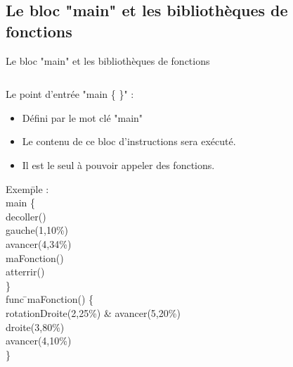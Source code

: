 \documentclass{bredelebeamer}
\begin{document}
\subsection{Le bloc "main" et les bibliothèques de fonctions} 
\begin{frame}{Le bloc "main" et les bibliothèques de fonctions} 

\begin{columns}

\begin{column}{0.5\textwidth}


Le point d'entrée "main \{ \}" :\\
\begin{itemize}
\item Défini par le mot clé "main"
\item Le contenu de ce bloc d'instructions sera exécuté.
\item Il est le seul à pouvoir appeler des fonctions.
\end{itemize}\pause

\begin{tabbing}
Exem\=ple :\\
	\>\color{Framarouge}main  \{\=\\ 
	\>\>\color{Framarouge}decoller()\\
	\>\>\color{Framarouge}gauche(\color{black}1\color{Framarouge},\color{Framagris}10\%\color{Framarouge})\\ 
	\>\>\color{Framarouge}avancer(\color{black}4\color{Framarouge},\color{Framagris}34\%\color{Framarouge})\\
	\>\>\color{Framarouge}maFonction()\\ 
	\>\>\color{Framarouge}atterrir()\\
	\>\color{Framarouge}\}\\
	
	\>\color{Framarouge}func \=\color{black}maFonction\color{Framarouge}() \{\\ 
	\>\>\color{Framarouge}rotationDroite(\color{black}2\color{Framarouge},\color{Framagris}25\%\color{Framarouge}) \& 
	\color{Framarouge}avancer(\color{black}5\color{Framarouge},\color{Framagris}20\%\color{Framarouge})\\ 
	\>\>\color{Framarouge}droite(\color{black}3\color{Framarouge},\color{Framagris}80\%\color{Framarouge})\\ 
	\>\>\color{Framarouge}avancer(\color{black}4\color{Framarouge},\color{Framagris}10\%\color{Framarouge})\\ 
	\>\color{Framarouge}\}\pause


\end{tabbing}
\end{column}
\end{columns}
\end{frame}
\end{document}
